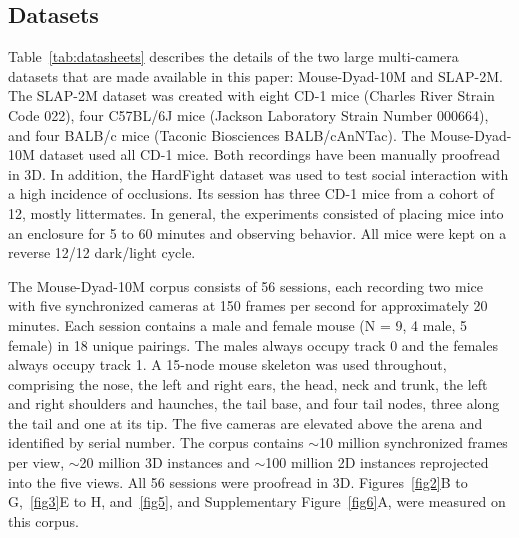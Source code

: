 \documentclass[pdflatex, sn-nature]{sn-jnl}
\theoremstyle{thmstyleone}%
\theoremstyle{thmstyletwo}%
\theoremstyle{thmstylethree}%
\begin{document}
\subsection{Datasets}\label{methods-datasets}
Table~\ref{tab:datasheets} describes the details of the two large multi-camera datasets that are made available in this paper: Mouse-Dyad-10M and SLAP-2M. The SLAP-2M dataset was created with eight CD-1 mice (Charles River Strain Code 022), four C57BL/6J mice (Jackson Laboratory Strain Number 000664), and four BALB/c mice (Taconic Biosciences BALB/cAnNTac). The Mouse-Dyad-10M dataset used all CD-1 mice. Both recordings have been manually proofread in 3D. In addition, the HardFight dataset was used to test social interaction with a high incidence of occlusions. Its session has three CD-1 mice from a cohort of 12, mostly littermates. In general, the experiments consisted of placing mice into an enclosure for 5 to 60 minutes and observing behavior. All mice were kept on a reverse 12/12 dark/light cycle.

The Mouse-Dyad-10M corpus consists of 56 sessions, each recording two mice with five synchronized cameras at 150 frames per second for approximately 20 minutes. Each session contains a male and female mouse (N = 9, 4 male, 5 female) in 18 unique pairings. The males always occupy track 0 and the females always occupy track 1. A 15-node mouse skeleton was used throughout, comprising the nose, the left and right ears, the head, neck and trunk, the left and right shoulders and haunches, the tail base, and four tail nodes, three along the tail and one at its tip. The five cameras are elevated above the arena and identified by serial number. The corpus contains $\sim$10 million synchronized frames per view, $\sim$20 million 3D instances and $\sim$100 million 2D instances reprojected into the five views. All 56 sessions were proofread in 3D. Figures~\ref{fig2}B to G,~\ref{fig3}E to H, and~\ref{fig5}, and Supplementary Figure~\ref{fig6}A, were measured on this corpus.
\end{document}
